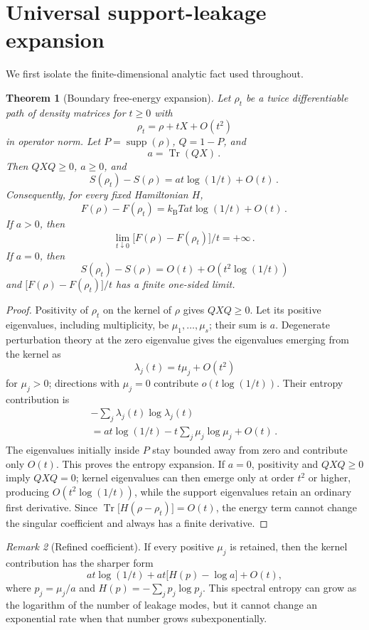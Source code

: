 \documentclass[11pt,a4paper]{article}
\newtheorem{theorem}{Theorem}[section]
\theoremstyle{remark}
\newtheorem{remark}[theorem]{Remark}
\begin{document}
\section{Universal support-leakage expansion}
We first isolate the finite-dimensional analytic fact used throughout.
\begin{theorem}[Boundary free-energy expansion]
Let $\rho_t$ be a twice differentiable path of density matrices for $t\ge 0$ with
\[
\rho_t=\rho+t X+O(t^{2})
\]
in operator norm. Let $P=\operatorname{supp}(\rho)$, $Q=1-P$, and
\[
a=\operatorname{Tr}(QX)\mathpunct{.}
\]
Then $QXQ\ge 0$, $a\ge 0$, and
\[
S(\rho_t)-S(\rho)=a t \log(1/t)+O(t)\mathpunct{.}
\]
Consequently, for every fixed Hamiltonian $H$,
\[
F(\rho)-F(\rho_t)=k_{\mathrm B} T a t \log(1/t)+O(t)\mathpunct{.}
\]
If $a>0$, then
\[
\lim_{t\downarrow 0}\bigl[F(\rho)-F(\rho_t)\bigr]/t=+\infty\mathpunct{.}
\]
If $a=0$, then
\[
S(\rho_t)-S(\rho)=O(t)+O(t^{2} \log(1/t))
\]
and $\bigl[F(\rho)-F(\rho_t)\bigr]/t$ has a finite one-sided limit.
\end{theorem}
\begin{proof}
Positivity of $\rho_t$ on the kernel of $\rho$ gives $QXQ\ge 0$. Let its positive eigenvalues, including multiplicity, be $\mu_1,\ldots,\mu_s$; their sum is $a$. Degenerate perturbation theory at the zero eigenvalue gives the eigenvalues emerging from the kernel as
\[
\lambda_j(t)=t \mu_j+O(t^{2})
\]
for $\mu_j>0$; directions with $\mu_j=0$ contribute $o(t \log(1/t))$. Their entropy contribution is
\[
\begin{gathered}
-\sum_{j} \lambda_j(t)\log \lambda_j(t) \\
=a t \log(1/t)-t \sum_{j} \mu_j \log \mu_j+O(t)\mathpunct{.}
\end{gathered}
\]
The eigenvalues initially inside $P$ stay bounded away from zero and contribute only $O(t)$. This proves the entropy expansion. If $a=0$, positivity and $QXQ\ge 0$ imply $QXQ=0$; kernel eigenvalues can then emerge only at order $t^{2}$ or higher, producing $O(t^{2} \log(1/t))$, while the support eigenvalues retain an ordinary first derivative. Since $\operatorname{Tr}\bigl[H(\rho-\rho_t)\bigr]=O(t)$, the energy term cannot change the singular coefficient and always has a finite derivative.
\end{proof}
\begin{remark}[Refined coefficient]
If every positive $\mu_j$ is retained, then the kernel contribution has the sharper form
\[
a t \log(1/t)+a t\bigl[H(p)-\log a\bigr]+O(t)\mathpunct{,}
\]
where $p_j=\mu_j/a$ and $H(p)=-\sum_{j} p_j \log p_j$. This spectral entropy can grow as the logarithm of the number of leakage modes, but it cannot change an exponential rate when that number grows subexponentially.
\end{remark}
\end{document}
